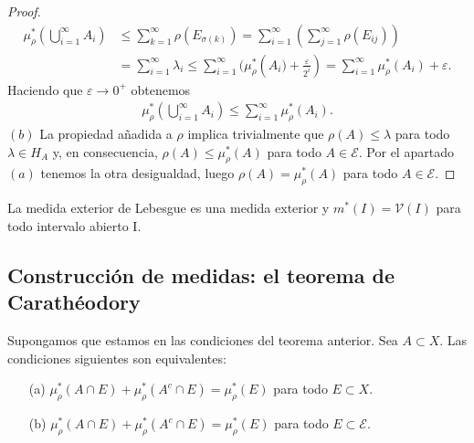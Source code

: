 \begin{proof}
\begin{align*}
    \mu_{\rho}^*\left( \bigcup_{i=1}^{\infty}{A_i}\right) & \leq \sum_{k=1}^{\infty}{\rho(E_{\sigma(k)})} = \sum_{i=1}^{\infty}{\left( \sum_{j=1}^{\infty}{\rho(E_{ij})}\right)}\\
    & = \sum_{i=1}^{\infty}{\lambda_i} \leq \sum_{i=1}^{\infty}{(\mu_{\rho}^*\left(A_i) + \frac{\varepsilon}{2^i}\right)} = \sum_{i=1}^{\infty}{\mu_{\rho}^*(A_i) + \varepsilon}.
\end{align*}
Haciendo que $\varepsilon \to 0^+$ obtenemos
\begin{align*}
    \mu_{\rho}^*\left( \bigcup_{i=1}^{\infty}{A_i}\right) \leq \sum_{i=1}^{\infty}{\mu_{\rho}^*(A_i)}.
\end{align*}
$(b)$ La propiedad añadida a $\rho$ implica trivialmente que $\rho(A) \leq \lambda$ para todo $\lambda \in H_A$ y, en consecuencia, $\rho(A) \leq \mu_{\rho}^*(A)$ para todo $A \in \mathcal{E}$. Por el apartado $(a)$ tenemos la otra desigualdad, luego $\rho(A) = \mu_{\rho}^*(A)$ para todo $A \in \mathcal{E}$.
\end{proof}

\begin{cor}
La medida exterior de Lebesgue es una medida exterior y $m^*(I) = \mathcal{V}(I)$ para todo intervalo abierto I.
\end{cor}

\subsection{Construcción de medidas: el teorema de Carathéodory}
\begin{teo}
Supongamos que estamos en las condiciones del teorema anterior. Sea $A \subset X$. Las condiciones siguientes son equivalentes:
\begin{enumerate}
    \item[(a)] $\mu_{\rho}^*(A \cap E) + \mu_{\rho}^*(A^c \cap E) = \mu_{\rho}^*(E)$ para todo $E \subset X$. \item[(b)] $\mu_{\rho}^*(A \cap E) + \mu_{\rho}^*(A^c \cap E) = \mu_{\rho}^*(E)$ para todo $E \subset \mathcal{E}$.
\end{enumerate}
\end{teo}

